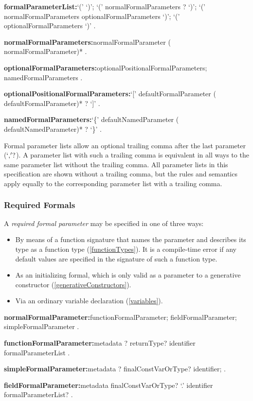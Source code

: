 \documentclass{article}
\begin{document}
\begin{grammar}
{\bf formalParameterList:}`(' `)';
  `(' normalFormalParameters \gcomma{}? `)';
  `(' normalFormalParameters \gcomma{} optionalFormalParameters `)';
  `(' optionalFormalParameters `)'
  .

{\bf normalFormalParameters:}normalFormalParameter (\gcomma{} normalFormalParameter)*
  .

{\bf optionalFormalParameters:}optionalPositionalFormalParameters;
  namedFormalParameters
  .

{\bf optionalPositionalFormalParameters:}`[' defaultFormalParameter (\gcomma{} defaultFormalParameter)* \gcomma{}? `]'
  .

{\bf namedFormalParameters:}`\{' defaultNamedParameter (\gcomma{} defaultNamedParameter)* \gcomma{}? `\}'
  .
\end{grammar}

Formal parameter lists allow an optional trailing comma after the last parameter ($`,\!'?$).
A parameter list with such a trailing comma is equivalent in all ways to the same parameter list without the trailing comma.
All parameter lists in this specification are shown without a trailing comma, but the rules and semantics apply equally to the corresponding parameter list with a trailing comma.


\subsubsection{Required Formals}

\LMHash{}
A {\em required formal parameter} may be specified in one of three ways:
\begin{itemize}
\item By means of a function signature that names the parameter and describes its type as a function type (\ref{functionTypes}).
It is a compile-time error if any default values are specified in the signature of such a function type.%
\item As an initializing formal, which is only valid as a parameter to a generative constructor (\ref{generativeConstructors}). %
\item Via an ordinary variable declaration (\ref{variables}).
\end{itemize}

\begin{grammar}
{\bf normalFormalParameter:}functionFormalParameter;
  fieldFormalParameter;
  simpleFormalParameter
  .

{\bf functionFormalParameter:}metadata \COVARIANT{}? returnType? identifier formalParameterList
  .

{\bf simpleFormalParameter:}metadata \COVARIANT{}? finalConstVarOrType? identifier;
  .

{\bf fieldFormalParameter:}metadata finalConstVarOrType? \THIS{} `{\escapegrammar .}' identifier
  \gnewline{} formalParameterList?
  .
\end{grammar}
\end{document}
